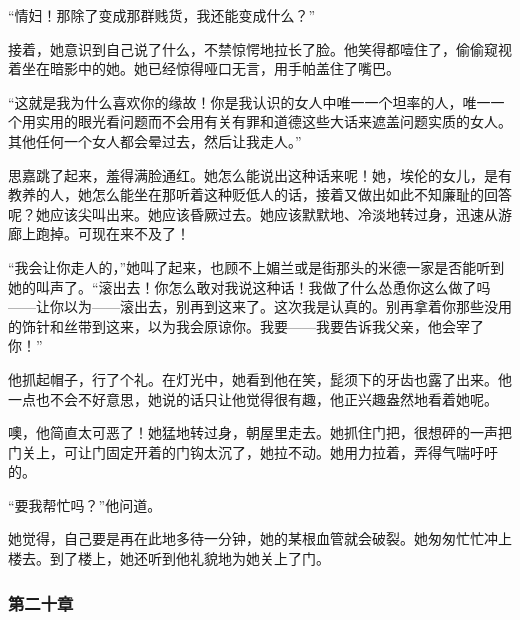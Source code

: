 \par “情妇！那除了变成那群贱货，我还能变成什么？”
\par 接着，她意识到自己说了什么，不禁惊愕地拉长了脸。他笑得都噎住了，偷偷窥视着坐在暗影中的她。她已经惊得哑口无言，用手帕盖住了嘴巴。
\par “这就是我为什么喜欢你的缘故！你是我认识的女人中唯一一个坦率的人，唯一一个用实用的眼光看问题而不会用有关有罪和道德这些大话来遮盖问题实质的女人。其他任何一个女人都会晕过去，然后让我走人。”
\par 思嘉跳了起来，羞得满脸通红。她怎么能说出这种话来呢！她，埃伦的女儿，是有教养的人，她怎么能坐在那听着这种贬低人的话，接着又做出如此不知廉耻的回答呢？她应该尖叫出来。她应该昏厥过去。她应该默默地、冷淡地转过身，迅速从游廊上跑掉。可现在来不及了！
\par “我会让你走人的，”她叫了起来，也顾不上媚兰或是街那头的米德一家是否能听到她的叫声了。“滚出去！你怎么敢对我说这种话！我做了什么怂恿你这么做了吗——让你以为——滚出去，别再到这来了。这次我是认真的。别再拿着你那些没用的饰针和丝带到这来，以为我会原谅你。我要——我要告诉我父亲，他会宰了你！”
\par 他抓起帽子，行了个礼。在灯光中，她看到他在笑，髭须下的牙齿也露了出来。他一点也不会不好意思，她说的话只让他觉得很有趣，他正兴趣盎然地看着她呢。
\par 噢，他简直太可恶了！她猛地转过身，朝屋里走去。她抓住门把，很想砰的一声把门关上，可让门固定开着的门钩太沉了，她拉不动。她用力拉着，弄得气喘吁吁的。
\par “要我帮忙吗？”他问道。
\par 她觉得，自己要是再在此地多待一分钟，她的某根血管就会破裂。她匆匆忙忙冲上楼去。到了楼上，她还听到他礼貌地为她关上了门。

\subsubsection{第二十章}

